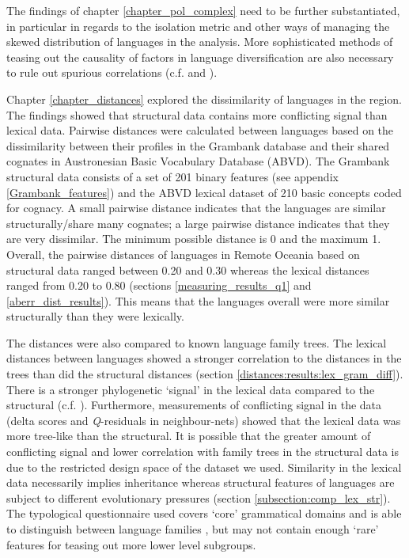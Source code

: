 \documentclass[draft,10pt]{article} %
\begin{document}
The findings of chapter \ref{chapter_pol_complex} need to be further substantiated, in particular in regards to the isolation metric and other ways of managing the skewed distribution of languages in the analysis. More sophisticated methods of teasing out the causality of factors in language diversification are also necessary to rule out spurious correlations (c.f. \cite{Sean_2018} and \cite{Pacheco_Coelho_2019}). 

Chapter \ref{chapter_distances} explored the dissimilarity of languages in the region. The findings showed that structural data contains more conflicting signal than lexical data. Pairwise distances were calculated between languages based on the dissimilarity between their profiles in the Grambank database and their shared cognates in Austronesian Basic Vocabulary Database (ABVD). The Grambank structural data consists of a set of 201 binary features (see appendix \ref{Grambank_features}) and the ABVD lexical dataset of 210 basic concepts coded for cognacy. A small pairwise distance indicates that the languages are similar structurally/share many cognates; a large pairwise distance indicates that they are very dissimilar. The minimum possible distance is 0 and the maximum 1. Overall, the pairwise distances of languages in Remote Oceania based on structural data ranged between 0.20 and 0.30 whereas the lexical distances ranged from 0.20 to 0.80 (sections \ref{measuring_results_q1} and \ref{aberr_dist_results}). This means that the languages overall were more similar structurally than they were lexically.

The distances were also compared to known language family trees. The lexical distances between languages showed a stronger correlation to the distances in the trees than did the structural distances (section \ref{distances:results:lex_gram_diff}). There is a stronger phylogenetic `signal' in the lexical data compared to the structural (c.f. \cite{greenhilletal_2017}). Furthermore, measurements of conflicting signal in the data (delta scores and \emph{Q}-residuals in neighbour-nets) showed that the lexical data was more tree-like than the structural. It is possible that the greater amount of conflicting signal and lower correlation with family trees in the structural data is due to the restricted design space of the dataset we used. Similarity in the lexical data necessarily implies inheritance whereas structural features of languages are subject to different evolutionary pressures (section \ref{subsection:comp_lex_str}). The typological questionnaire used covers `core' grammatical domains and is able to distinguish between language families \citep{grambank_release}, but may not contain enough `rare' features for teasing out more lower level subgroups.
\end{document}
